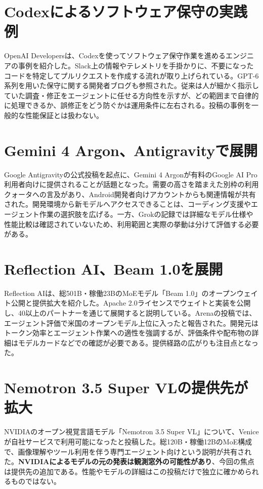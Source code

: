 \section{Codexによるソフトウェア保守の実践例}
OpenAI Developersは、Codexを使ってソフトウェア保守作業を進めるエンジニアの事例を紹介した。Slack上の情報やテレメトリを手掛かりに、不要になったコードを特定してプルリクエストを作成する流れが取り上げられている。GPT-6系列を用いた保守に関する開発者ブログも参照された。従来は人が細かく指示していた調査・修正をエージェントに任せる方向性を示すが、どの範囲まで自律的に処理できるか、誤修正をどう防ぐかは運用条件に左右される。投稿の事例を一般的な性能保証とは扱わない。

\section{Gemini 4 Argon、Antigravityで展開}
Google Antigravityの公式投稿を起点に、Gemini 4 Argonが有料のGoogle AI Pro利用者向けに提供されることが話題となった。需要の高さを踏まえた別枠の利用クォータへの言及があり、Android開発者向けアカウントからも関連情報が共有された。開発環境から新モデルへアクセスできることは、コーディング支援やエージェント作業の選択肢を広げる。一方、Grokの記録では詳細なモデル仕様や性能比較は確認されていないため、利用範囲と実際の挙動は分けて評価する必要がある。

\section{Reflection AI、Beam 1.0を展開}
Reflection AIは、総501B・稼働23BのMoEモデル「Beam 1.0」のオープンウェイト公開と提供拡大を紹介した。Apache 2.0ライセンスでウェイトと実装を公開し、40以上のパートナーを通じて展開すると説明している。Arenaの投稿では、エージェント評価で米国のオープンモデル上位に入ったと報告された。開発元はトークン効率とエージェント作業への適性を強調するが、評価条件や配布物の詳細はモデルカードなどでの確認が必要である。提供経路の広がりも注目点となった。

\section{Nemotron 3.5 Super VLの提供先が拡大}
NVIDIAのオープン視覚言語モデル「Nemotron 3.5 Super VL」について、Veniceが自社サービスで利用可能になったと投稿した。総120B・稼働12BのMoE構成で、画像理解やツール利用を伴う専門エージェント向けという説明が共有された。\textbf{NVIDIAによるモデルの元の発表は観測窓外の可能性があり}、今回の焦点は提供先の追加である。性能やモデルの詳細はこの投稿だけで独立に確かめられるものではない。

